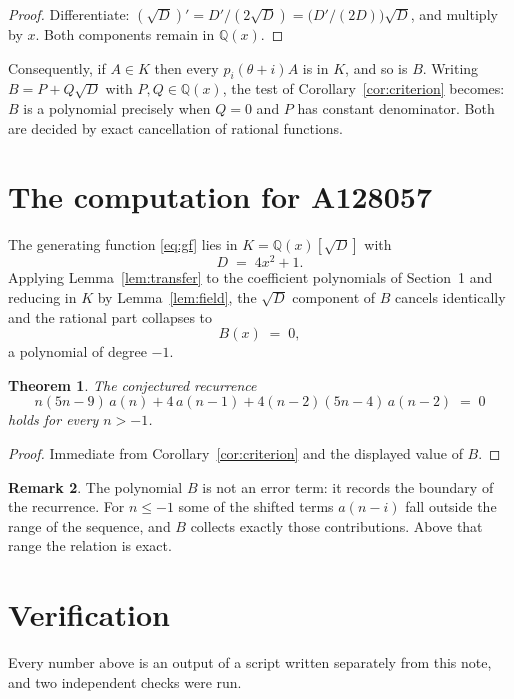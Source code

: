 \documentclass[11pt,a4paper]{article}
\theoremstyle{plain}
\newtheorem{theorem}{Theorem}
\theoremstyle{definition}
\newtheorem{remark}[theorem]{Remark}
\begin{document}
\begin{proof}
Differentiate: $(\sqrt{D})'=D'/(2\sqrt{D})=\bigl(D'/(2D)\bigr)\sqrt{D}$, and multiply by
$x$. Both components remain in $\mathbb{Q}(x)$.
\end{proof}

Consequently, if $A\in K$ then every $p_{i}(\theta+i)A$ is in $K$, and so is $B$. Writing
$B=P+Q\sqrt{D}$ with $P,Q\in\mathbb{Q}(x)$, the test of Corollary~\ref{cor:criterion}
becomes: $B$ is a polynomial precisely when $Q=0$ and $P$ has constant denominator. Both
are decided by exact cancellation of rational functions.

\section{The computation for A128057}

The generating function \eqref{eq:gf} lies in $K=\mathbb{Q}(x)[\sqrt{D}]$ with
\[
D \;=\; 4 x^{2} + 1 .
\]
Applying Lemma~\ref{lem:transfer} to the coefficient polynomials of Section~1 and reducing
in $K$ by Lemma~\ref{lem:field}, the $\sqrt{D}$ component of $B$ cancels identically and
the rational part collapses to
\[
B(x)\;=\;0 ,
\]
a polynomial of degree $-1$.

\begin{theorem}
The conjectured recurrence
\[
n \left(5 n - 9\right)\,a(n) + 4\,a(n-1) + 4 \left(n - 2\right) \left(5 n - 4\right)\,a(n-2) \;=\;0
\]
holds for every $n>-1$.
\end{theorem}

\begin{proof}
Immediate from Corollary~\ref{cor:criterion} and the displayed value of $B$.
\end{proof}

\begin{remark}
The polynomial $B$ is not an error term: it records the boundary of the recurrence. For
$n\le-1$ some of the shifted terms $a(n-i)$ fall outside the range of the sequence,
and $B$ collects exactly those contributions. Above that range the relation is exact.
\end{remark}

\section{Verification}

Every number above is an output of a script written separately from this note, and two
independent checks were run.
\end{document}
